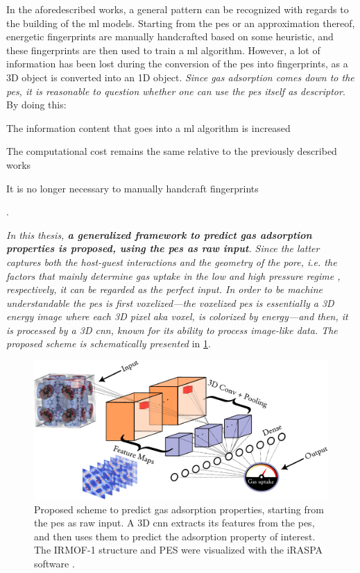 In the aforedescribed works, a general pattern can be recognized with regards to
the building of the \gls{ml} models. Starting from the \gls{pes} or an approximation thereof, energetic fingerprints are manually
handcrafted based on some heuristic, and these fingerprints are then used to
train a \gls{ml} algorithm. However, a lot of information has been lost during
the conversion of the \gls{pes} into fingerprints, as a 3D object is converted
into an 1D object.  \emph{Since gas adsorption comes down to the \gls{pes}, it
is reasonable to question whether one can use the \gls{pes} itself as
descriptor}. By doing this:
\begin{enumerate*}
	\item The information content that goes into a \gls{ml} algorithm is increased
	\item The computational cost remains the same relative
		to the previously described works
	\item It is no longer necessary to manually handcraft fingerprints
\end{enumerate*}.

\emph{In this thesis, \textbf{a generalized framework to predict gas adsorption
properties is proposed, using the \gls{pes} as raw input}. Since the latter captures
both the host-guest interactions and the geometry of the pore, i.e. the factors
that mainly determine gas uptake in the low and high pressure regime
\parencite{concepts}, respectively, it can be regarded as the perfect input. In
order to be machine understandable the \gls{pes} is first voxelized---the
voxelized \gls{pes} is essentially a 3D energy image where
each 3D pixel aka voxel, is colorized by energy---and then, it is processed by a
3D \acrlong{cnn}, known for its ability to process image-like data. The proposed
scheme is schematically presented} in \Figure{} \ref{fig:approach}.

\begin{figure}
	\centering
	\includegraphics[width=\textwidth]{fig/approach.pdf}
	\caption[Generalized framework to predict gas adsorption
	properties.]{Proposed scheme to predict gas adsorption properties, starting
	from the \gls{pes} as raw input. A 3D \gls{cnn} extracts its
	features from the \gls{pes}, and then uses them to predict
	the adsorption property of interest. The IRMOF-1 structure and PES were
	visualized with the iRASPA software \parencite{Dubbeldam2018}.}
	\label{fig:approach}
\end{figure}
